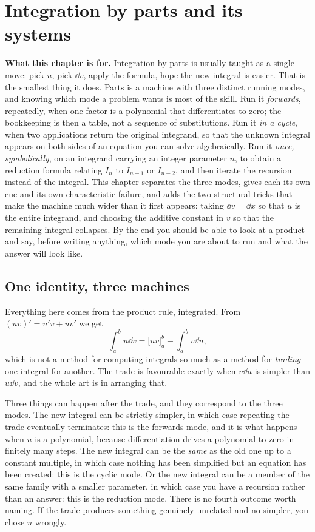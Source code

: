 \chapter{Integration by parts and its systems}

\begin{orient}
\textbf{What this chapter is for.} Integration by parts is usually taught as a single move: pick $u$, pick $\dd v$, apply the formula, hope the new integral is easier. That is the smallest thing it does. Parts is a machine with three distinct running modes, and knowing which mode a problem wants is most of the skill. Run it \emph{forwards}, repeatedly, when one factor is a polynomial that differentiates to zero; the bookkeeping is then a table, not a sequence of substitutions. Run it \emph{in a cycle}, when two applications return the original integrand, so that the unknown integral appears on both sides of an equation you can solve algebraically. Run it \emph{once, symbolically}, on an integrand carrying an integer parameter $n$, to obtain a reduction formula relating $I_n$ to $I_{n-1}$ or $I_{n-2}$, and then iterate the recursion instead of the integral. This chapter separates the three modes, gives each its own cue and its own characteristic failure, and adds the two structural tricks that make the machine much wider than it first appears: taking $\dd v=\dd x$ so that $u$ is the entire integrand, and choosing the additive constant in $v$ so that the remaining integral collapses. By the end you should be able to look at a product and say, before writing anything, which mode you are about to run and what the answer will look like.
\end{orient}

\section{One identity, three machines}

Everything here comes from the product rule, integrated. From $(uv)'=u'v+uv'$ we get
\[\int_a^b u\dd v=\bigl[uv\bigr]_a^b-\int_a^b v\dd u,\]
which is not a method for computing integrals so much as a method for \emph{trading} one integral for another. The trade is favourable exactly when $v\dd u$ is simpler than $u\dd v$, and the whole art is in arranging that.

Three things can happen after the trade, and they correspond to the three modes. The new integral can be strictly simpler, in which case repeating the trade eventually terminates: this is the forwards mode, and it is what happens when $u$ is a polynomial, because differentiation drives a polynomial to zero in finitely many steps. The new integral can be the \emph{same} as the old one up to a constant multiple, in which case nothing has been simplified but an equation has been created: this is the cyclic mode. Or the new integral can be a member of the same family with a smaller parameter, in which case you have a recursion rather than an answer: this is the reduction mode. There is no fourth outcome worth naming. If the trade produces something genuinely unrelated and no simpler, you chose $u$ wrongly.

